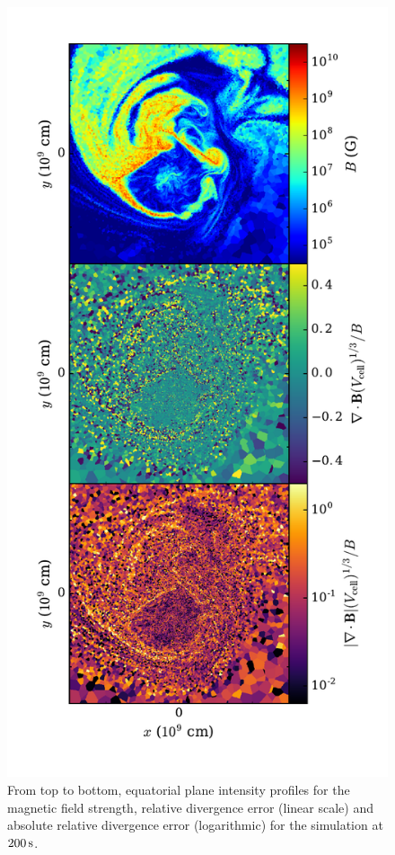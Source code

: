 
\begin{figure}
\centering
\includegraphics[angle=0,width=0.6\columnwidth]{chapter4_zhu+15/figures/bdiv.pdf}
\caption{From top to bottom, equatorial plane intensity profiles for the magnetic field strength, relative divergence error (linear scale) and absolute relative divergence error (logarithmic) for the simulation at $200\,\mathrm{s}$.}
\label{fig:c4_bdiv}
\end{figure}

